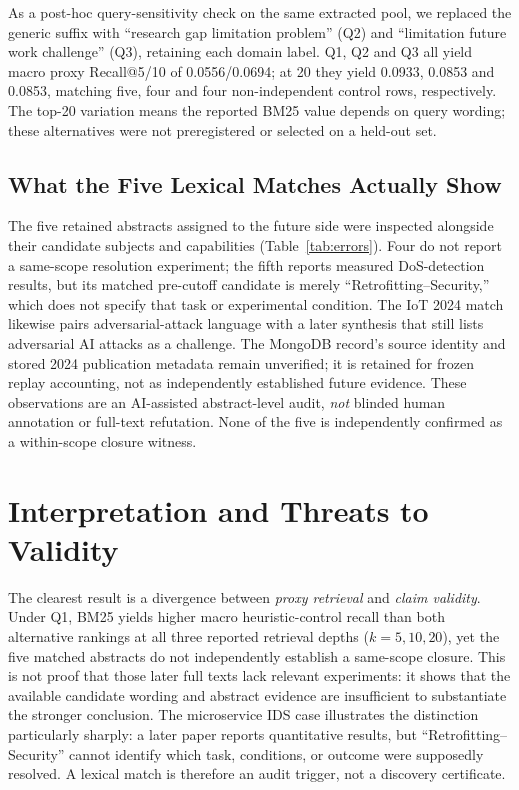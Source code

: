 \documentclass[conference,a4paper]{IEEEtran}
\begin{document}
As a post-hoc query-sensitivity check on the same extracted pool, we replaced the generic suffix with ``research gap limitation problem'' (Q2) and ``limitation future work challenge'' (Q3), retaining each domain label. Q1, Q2 and Q3 all yield macro proxy Recall@5/10 of 0.0556/0.0694; at 20 they yield 0.0933, 0.0853 and 0.0853, matching five, four and four non-independent control rows, respectively. The top-20 variation means the reported BM25 value depends on query wording; these alternatives were not preregistered or selected on a held-out set.

\subsection{What the Five Lexical Matches Actually Show}
The five retained abstracts assigned to the future side were inspected alongside their candidate subjects and capabilities (Table~\ref{tab:errors}). Four do not report a same-scope resolution experiment; the fifth reports measured DoS-detection results, but its matched pre-cutoff candidate is merely ``Retrofitting--Security,'' which does not specify that task or experimental condition. The IoT 2024 match likewise pairs adversarial-attack language with a later synthesis that still lists adversarial AI attacks as a challenge. The MongoDB record's source identity and stored 2024 publication metadata remain unverified; it is retained for frozen replay accounting, not as independently established future evidence. These observations are an AI-assisted abstract-level audit, \emph{not} blinded human annotation or full-text refutation. None of the five is independently confirmed as a within-scope closure witness.

\section{Interpretation and Threats to Validity}
The clearest result is a divergence between \emph{proxy retrieval} and \emph{claim validity}. Under Q1, BM25 yields higher macro heuristic-control recall than both alternative rankings at all three reported retrieval depths ($k=5,10,20$), yet the five matched abstracts do not independently establish a same-scope closure. This is not proof that those later full texts lack relevant experiments: it shows that the available candidate wording and abstract evidence are insufficient to substantiate the stronger conclusion. The microservice IDS case illustrates the distinction particularly sharply: a later paper reports quantitative results, but ``Retrofitting--Security'' cannot identify which task, conditions, or outcome were supposedly resolved. A lexical match is therefore an audit trigger, not a discovery certificate.
\end{document}
